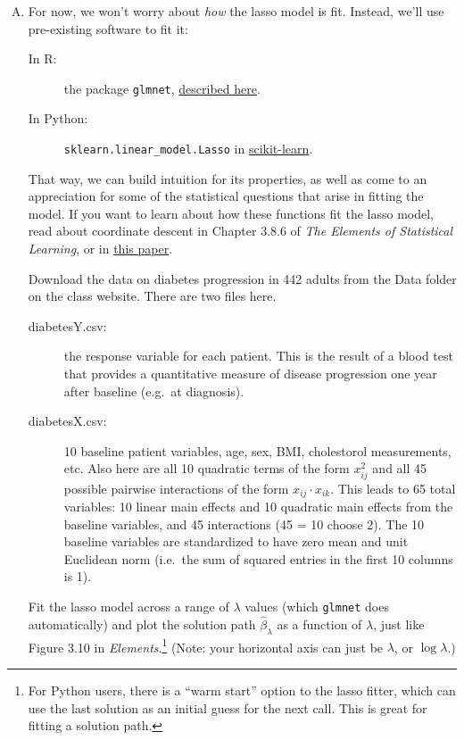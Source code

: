 \documentclass{mynotes}
\begin{document}
\begin{enumerate}[(A)]

\item For now, we won't worry about \textit{how} the lasso model is fit.  Instead, we'll use pre-existing software to fit it:
\begin{description}
\item[In R:] the package \verb|glmnet|, \href{https://web.stanford.edu/~hastie/glmnet/glmnet_alpha.html}{described here}.
\item[In Python:] \verb|sklearn.linear_model.Lasso| in \href{http://scikit-learn.org/stable/index.html}{scikit-learn}.
\end{description}
That way, we can build intuition for its properties, as well as come to an appreciation for some of the statistical questions that arise in fitting the model.  If you want to learn about how these functions fit the lasso model, read about coordinate descent in Chapter 3.8.6 of \textit{The Elements of Statistical Learning}, or in \href{http://arxiv.org/pdf/0708.1485.pdf}{this paper}.

Download the data on diabetes progression in 442 adults from the Data folder on the class website.  There are two files here.
\begin{description}
\item[diabetesY.csv:] the response variable for each patient.  This is the result of a blood test that provides a quantitative measure of disease progression one year after baseline (e.g.~at diagnosis).
\item[diabetesX.csv:] 10 baseline patient variables, age, sex, BMI, cholestorol measurements, etc.  Also here are all 10 quadratic terms of the form $x_{ij}^2$ and all 45 possible pairwise interactions of the form $x_{ij} \cdot x_{ik}$.  This leads to 65 total variables: 10 linear main effects and 10 quadratic main effects from the baseline variables, and 45 interactions (45 = 10 choose 2).  The 10  baseline variables are standardized to have zero mean and unit Euclidean norm (i.e.~the sum of squared entries in the first 10 columns is 1).
\end{description}

Fit the lasso model across a range of $\lambda$ values (which \verb|glmnet| does automatically) and plot the solution path $\hat{\beta}_{\lambda}$ as a function of $\lambda$, just like Figure 3.10 in \textit{Elements}.\footnote{For Python users, there is a ``warm start'' option to the lasso fitter, which can use the last solution as an initial guess for the next call.  This is great for fitting a solution path.}  (Note: your horizontal axis can just be $\lambda$, or $\log \lambda$.)


\end{enumerate}
\end{document}

